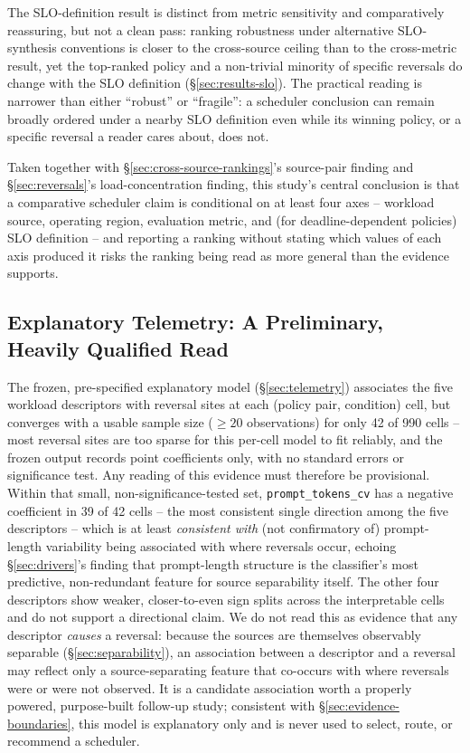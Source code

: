 The SLO-definition result is distinct from metric sensitivity and
comparatively reassuring, but not a clean pass: ranking robustness under
alternative SLO-synthesis conventions is closer to the cross-source ceiling
than to the cross-metric result, yet the top-ranked policy and a non-trivial
minority of specific reversals do change with the SLO definition
(\S\ref{sec:results-slo}). The practical reading is narrower than either
``robust'' or ``fragile'': a scheduler conclusion can remain broadly
ordered under a nearby SLO definition even while its winning policy, or a
specific reversal a reader cares about, does not.

Taken together with \S\ref{sec:cross-source-rankings}'s source-pair finding
and \S\ref{sec:reversals}'s load-concentration finding, this study's central
conclusion is that a comparative scheduler claim is conditional on at least
four axes -- workload source, operating region, evaluation metric, and (for
deadline-dependent policies) SLO definition -- and reporting a ranking
without stating which values of each axis produced it risks the ranking
being read as more general than the evidence supports.

\subsection{Explanatory Telemetry: A Preliminary, Heavily Qualified Read}
\label{sec:telemetry-explanation}

The frozen, pre-specified explanatory model (\S\ref{sec:telemetry})
associates the five workload
descriptors with reversal sites at each (policy pair, condition) cell, but
converges with a usable sample size ($\geq 20$ observations) for only 42 of
990 cells -- most reversal sites are too sparse for this per-cell model to
fit reliably, and the frozen output records point coefficients only, with
no standard errors or significance test. Any reading of this evidence must
therefore be provisional. Within that small, non-significance-tested set,
\texttt{prompt\_tokens\_cv} has a negative coefficient in 39 of 42 cells --
the most consistent single direction among the five descriptors -- which
is at least \emph{consistent with} (not confirmatory of) prompt-length
variability being associated with where reversals occur, echoing
\S\ref{sec:drivers}'s finding that prompt-length structure is the
classifier's most predictive, non-redundant feature for source
separability itself. The other four descriptors show
weaker, closer-to-even sign splits across the interpretable cells and do
not support a directional claim. We do not read this as evidence that any
descriptor \emph{causes} a reversal: because the sources are themselves
observably separable (\S\ref{sec:separability}), an association between a
descriptor and a reversal may reflect only a source-separating feature that
co-occurs with where reversals were or were not observed. It is a candidate
association worth a properly powered, purpose-built follow-up study;
consistent with \S\ref{sec:evidence-boundaries}, this model is explanatory
only and is never used to select, route, or recommend a scheduler.

